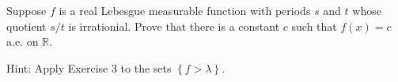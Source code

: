 \documentclass[12pt, a4paper, oneside]{book}
\begin{document}
\begin{question}
    Suppose $f$ is a real Lebesgue measurable function with periods $s$ and $t$ whose quotient $s / t$ is irrationial. Prove that there is a constant $c$ such that $f(x)=c$ a.e. on $\mathbb{R}$.

    Hint: Apply Exercise 3 to the sets $\left\{f>\lambda\right\}$.
\end{question}
\end{document}
